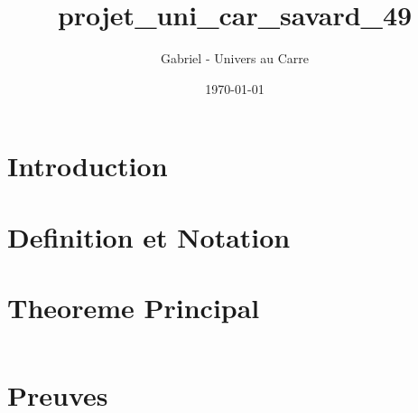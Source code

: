 \documentclass[12pt]{article}
\title{projet_uni_car_savard_49}
\author{Gabriel - Univers au Carre}
\date{\today}
\begin{document}
\maketitle


\section{Introduction}



\section{Definition et Notation}



\section{Theoreme Principal}


\begin{equation}
\end{equation}


\section{Preuves}


\end{document}
